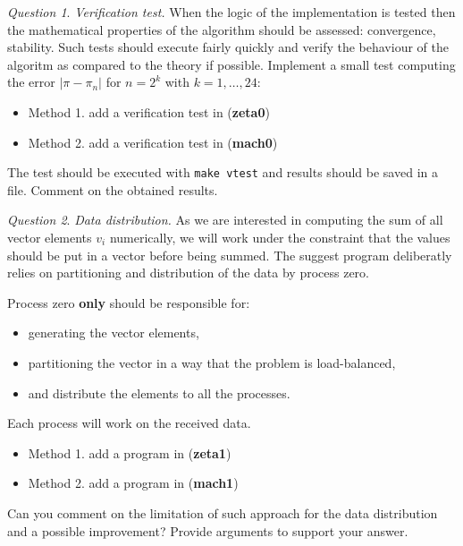 \documentclass[onecolumn, oneside, a4paper, 11pt]{memoir}
\theoremstyle{remark}
\newtheorem{ex}{Question}
\begin{document}
\bigskip
\begin{ex}
\textit{Verification test.} When the logic of the implementation is tested then the mathematical properties of the algorithm should be assessed: convergence, stability.
Such tests should execute fairly quickly and verify the behaviour of the algoritm as compared to the theory if possible.
Implement a small test computing the error $|\pi - \pi_n|$ for $n=2^k$ with $k=1,\ldots,24$:
  \begin{itemize}
  \item Method 1. add a verification test in (\textbf{zeta0})
  \item Method 2. add a verification test in (\textbf{mach0})
  \end{itemize}
The test should be executed with \texttt{make vtest} and results should be saved in a file.
Comment on the obtained results.
\end{ex}

\bigskip
\begin{ex}
\textit{Data distribution.}
As we are interested in computing the sum of all vector elements $v_i$ numerically, we will work under the constraint that the values should be put in a vector before being summed.
The suggest program deliberatly relies on partitioning and distribution of the data by process zero.

\medskip
Process zero \textbf{only} should be responsible for:
  \begin{itemize}
  \item generating the vector elements,
  \item partitioning the vector in a way that the problem is load-balanced,
  \item and distribute the elements to all the processes.
  \end{itemize}
  Each process will work on the received data.
\begin{itemize}
  \item Method 1. add a program in (\textbf{zeta1})
  \item Method 2. add a program in (\textbf{mach1})
\end{itemize}
Can you comment on the limitation of such approach for the data distribution and a possible improvement? Provide arguments to support your answer.
\end{ex}
\end{document}
